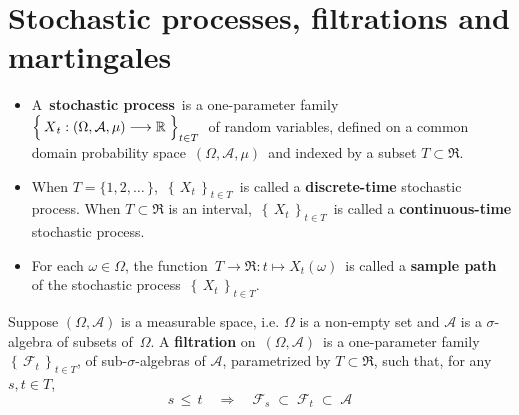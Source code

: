 

\section{Stochastic processes, filtrations and martingales}
\setcounter{theorem}{0}
\setcounter{equation}{0}


\renewcommand{\theenumi}{\roman{enumi}}
\renewcommand{\labelenumi}{\textnormal{(\theenumi)}$\;\;$}


\begin{definition}
\mbox{}
\vskip -0.2cm
\noindent
\begin{itemize}
\item
	A \,\textbf{stochastic process}\, is a one-parameter family
	\,$\left\{\,\overset{{\color{white}.}}{X}_{t} : (\Omega,\mathcal{A},\mu) \longrightarrow \Re \;\right\}_{t \in T}$\,
	of random variables, defined on a common domain probability space
	\,$(\Omega,\mathcal{A},\mu)$\, and indexed by a subset $T \subset \Re$.
\item
	When $T = \{1,2,\ldots\,\}$,
	\,$\left\{\,X_{t}\,\right\}_{t \in T}$\,
	is called a \textbf{discrete-time} stochastic process.
	When $T \subset \Re$ is an interval,
	\,$\left\{\,X_{t}\,\right\}_{t \in T}$\,
	is called a \textbf{continuous-time} stochastic process.
\item
	For each $\omega \in \Omega$, the function
	\,$T \longrightarrow \Re : t \longmapsto X_{t}(\omega)$\,
	is called a \textbf{sample path} of the stochastic process
	\,$\left\{\,X_{t}\,\right\}_{t \in T}$.	
\end{itemize}
\end{definition}


\begin{definition}[Filtration]
\mbox{}
\vskip 0.2cm
\noindent
Suppose $(\Omega,\mathcal{A})$ is a measurable space,
i.e. $\Omega$ is a non-empty set and $\mathcal{A}$ is a $\sigma$-algebra
of subsets of \,$\Omega$.
A \textbf{filtration} on \,$(\Omega,\mathcal{A})$\,
is a one-parameter family
$\left\{\,\mathcal{F}_{t}\,\right\}_{t \in T}$,
of sub-$\sigma$-algebras of $\mathcal{A}$,
parametrized by $T \subset \Re$,
such that, for any $s, t \in T$,
\begin{equation*}
s \,\leq\, t
\quad\Longrightarrow\quad
\mathcal{F}_{s} \; \subset \; \mathcal{F}_{t} \; \subset \; \mathcal{A}
\end{equation*}
\end{definition}

